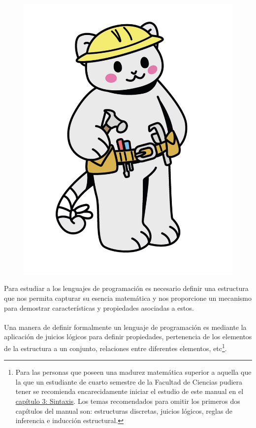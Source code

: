 

\begin{figure}[htbp]
    \centerline{\includegraphics[scale=.19]{assets/02_gatito_herramientas_matematicas.jpg}}
    \label{fig 1. Mapa para clasificar los lenguajes de programación.}        
\end{figure}

Para estudiar a los lenguajes de programación es necesario definir una estructura que nos permita capturar su esencia matemática y nos proporcione un mecanismo para demostrar características y propiedades asociadas a estos. \\\\
Una manera de definir formalmente un lenguaje de programación es mediante la aplicación de juicios lógicos para definir propiedades, pertenencia de los elementos de la estructura a un conjunto, relaciones entre diferentes elementos, etc\footnote{Para las personas que poseen una madurez matemática superior a aquella que la que un estudiante de cuarto semestre de la Facultad de Ciencias pudiera tener se recomienda encarecidamente iniciar el estudio de este manual en el \hyperref[sec:sintax]{capítulo 3: Sintaxis}. Los temas recomendados para omitir los primeros dos capítulos del manual son: estructuras discretas, juicios lógicos, reglas de inferencia e inducción estructural. }. \\
